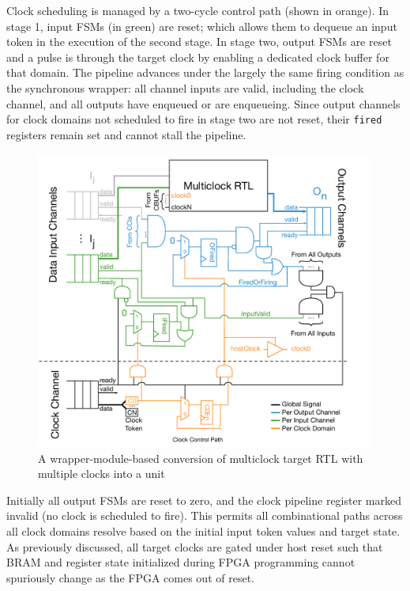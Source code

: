 Clock scheduling is managed by a two-cycle control path (shown in orange). In
stage 1, input FSMs (in green) are reset; which allows them to dequeue an input
token in the execution of the second stage. In stage two, output FSMs are reset and a
pulse is through the target clock by enabling a dedicated clock buffer for that
domain. The pipeline advances under the largely the same firing condition as the
synchronous wrapper: all channel inputs are valid, including the clock channel, and all outputs have
enqueued or are enqueueing. Since output channels for clock domains not scheduled to fire in
stage two are not reset, their \texttt{fired} registers remain set and cannot stall the pipeline.

\begin{figure}
    \centering
    \includegraphics[width=0.99\textwidth]{figures/static-multiclock-wrapper.pdf}
    \caption{A wrapper-module-based conversion of multiclock target RTL with multiple clocks into a unit}
    \label{fig:static-multiclock-wrapper}
\end{figure}


Initially all output FSMs are reset to zero, and the clock pipeline
register marked invalid (no clock is scheduled to fire).  This permits all combinational paths across all clock domains resolve based on the
initial input token values and target state.  As previously discussed, all
target clocks are gated under host reset such that BRAM and register state
initialized during FPGA programming cannot spuriously change as the FPGA comes
out of reset.

